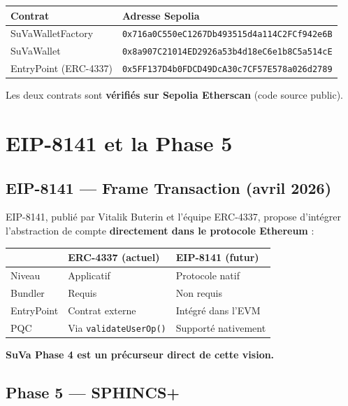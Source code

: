 \documentclass[11pt,a4paper]{article}
\begin{document}
\begin{center}
\begin{tabular}{ll}
\toprule
\textbf{Contrat} & \textbf{Adresse Sepolia} \\
\midrule
SuVaWalletFactory & \texttt{0x716a0C550eC1267Db493515d4a114C2FCf942e6B} \\
SuVaWallet & \texttt{0x8a907C21014ED2926a53b4d18eC6e1b8C5a514cE} \\
EntryPoint (ERC-4337) & \texttt{0x5FF137D4b0FDCD49DcA30c7CF57E578a026d2789} \\
\bottomrule
\end{tabular}
\end{center}

Les deux contrats sont \textbf{vérifiés sur Sepolia Etherscan} (code source public).

\section{EIP-8141 et la Phase 5}

\subsection{EIP-8141 --- Frame Transaction (avril 2026)}

EIP-8141, publié par Vitalik Buterin et l'équipe ERC-4337, propose d'intégrer l'abstraction de compte \textbf{directement dans le protocole Ethereum} :

\begin{center}
\begin{tabular}{lll}
\toprule
& \textbf{ERC-4337 (actuel)} & \textbf{EIP-8141 (futur)} \\
\midrule
Niveau & Applicatif & Protocole natif \\
Bundler & Requis & Non requis \\
EntryPoint & Contrat externe & Intégré dans l'EVM \\
PQC & Via \texttt{validateUserOp()} & Supporté nativement \\
\bottomrule
\end{tabular}
\end{center}

\textbf{SuVa Phase 4 est un précurseur direct de cette vision.}

\subsection{Phase 5 --- SPHINCS+}
\end{document}
